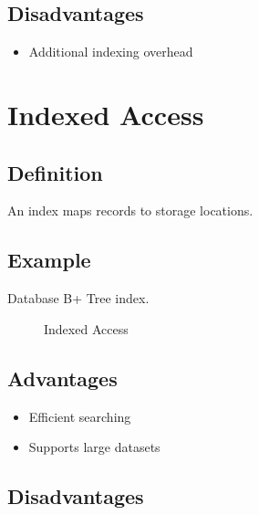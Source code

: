 \subsection{Disadvantages}

\begin{itemize}
\item Additional indexing overhead
\end{itemize}

\section{Indexed Access}

\subsection{Definition}

An index maps records to storage locations.

\subsection{Example}

Database B+ Tree index.

\begin{figure}[h]
\centering
{}
\caption{Indexed Access}
\end{figure}

\subsection{Advantages}

\begin{itemize}
\item Efficient searching
\item Supports large datasets
\end{itemize}

\subsection{Disadvantages}

